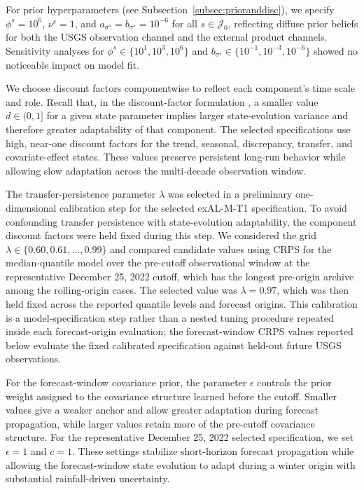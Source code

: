 \documentclass[APA,STIX1COL]{WileyNJD-v2}
\begin{document}
For prior hyperparameters (see Subsection~\ref{subsec:prioranddisc}), we specify \(\phi^s = 10^6\), \(\nu^s = 1\), and \(a_{\sigma^s} = b_{\sigma^s} = 10^{-6}\) for all \(s\in\mathcal{J}_0\), reflecting diffuse prior beliefs for both the USGS observation channel and the external product channels. Sensitivity analyses for \(\phi^s \in \{10^1, 10^3, 10^6\}\) and \(b_{\sigma^s} \in \{10^{-1}, 10^{-3}, 10^{-6}\}\) showed no noticeable impact on model fit.

We choose discount factors componentwise to reflect each component's time scale and role. Recall that, in the discount-factor formulation \citep{prado2021time}, a smaller value \(d \in (0,1]\) for a given state parameter implies larger state-evolution variance and therefore greater adaptability of that component. The selected specifications use high, near-one discount factors for the trend, seasonal, discrepancy, transfer, and covariate-effect states. These values preserve persistent long-run behavior while allowing slow adaptation across the multi-decade observation window.

The transfer-persistence parameter \(\lambda\) was selected in a preliminary one-dimensional calibration step for the selected exAL-M-T1 specification. To avoid confounding transfer persistence with state-evolution adaptability, the component discount factors were held fixed during this step. We considered the grid \(\lambda \in \{0.60,0.61,\ldots,0.99\}\) and compared candidate values using CRPS for the median-quantile model over the pre-cutoff observational window at the representative December 25, 2022 cutoff, which has the longest pre-origin archive among the rolling-origin cases. The selected value was \(\lambda=0.97\), which was then held fixed across the reported quantile levels and forecast origins. This calibration is a model-specification step rather than a nested tuning procedure repeated inside each forecast-origin evaluation; the forecast-window CRPS values reported below evaluate the fixed calibrated specification against held-out future USGS observations.

For the forecast-window covariance prior, the parameter \(\epsilon\) controls the prior weight assigned to the covariance structure learned before the cutoff. Smaller values give a weaker anchor and allow greater adaptation during forecast propagation, while larger values retain more of the pre-cutoff covariance structure. For the representative December 25, 2022 selected specification, we set \(\epsilon=1\) and \(c=1\). These settings stabilize short-horizon forecast propagation while allowing the forecast-window state evolution to adapt during a winter origin with substantial rainfall-driven uncertainty.
\end{document}
